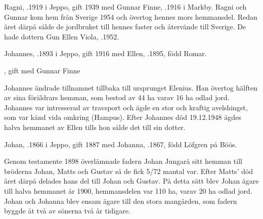 Ragni, .1919 i Jeppo, gift 1939 med Gunnar Finne, .1916 i Markby. Ragni och Gunnar kom hem från Sverige 1954 och övertog hennes mors hemmansdel. Redan året därpå sålde de jordbruket till  hennes faster och återvände till Sverige. De hade dottern Gun Ellen Viola, .1952.


Johannes, .1893 i Jeppo, gift 1916 med Ellen, .1895, född Romar.
\begin{jhchildren}
  \item {}
  \item {}, gift med Gunnar Finne
\end{jhchildren}
Johannes ändrade tillnamnet tillbaka till ursprunget Elenius. Han övertog hälften av sina föräldrars hemman, som bestod av 44 ha varav 16 ha odlad jord. Johannes var intresserad av travsport och ägde en stor och kraftig avelshingst, som var känd vida omkring (Hampus). Efter Johannes död 19.12.1948 ägdes halva hemmanet av Ellen tills hon sålde det till sin dotter.


Johan, .1866 i Jeppo, gift 1887 med Johanna, .1867, född Löfgren på Böös.
\begin{jhchildren}
  \item {}
  \item {}
  \item {}
  \item {}
  \item {}
  \item {}
\end{jhchildren}
Genom testamente 1898 överlämnade fadern Johan Jungarå sitt hemman till bröderna Johan, Matts och Gustav så de fick 5/72 mantal var. Efter Matts' död året därpå delades hans del till Johan och Gustav. På detta sätt blev Johan ägare till halva hemmanet år 1900, hemmansdelen var 110 ha, varav 20 ha odlad jord. Johan och Johanna blev ensam ägare till den stora mangården, som fadern byggde åt två av sönerna två år tidigare.


